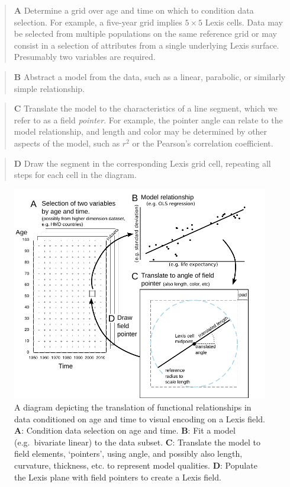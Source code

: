 \documentclass[10pt, twoside, parskip=half]{article}
\begin{document}
\begin{quote}
\textbf{A} Determine a grid over age and time on which to condition data selection. For example, a five-year grid implies \(5\times 5\) Lexis cells. Data may be selected from multiple populations on the same reference grid or may consist in a selection of attributes from a single underlying Lexis surface. Presumably two variables are required.
\end{quote}

\begin{quote}
\textbf{B} Abstract a model from the data, such as a linear, parabolic, or similarly simple relationship.
\end{quote}

\begin{quote}
\textbf{C} Translate the model to the characteristics of a line segment, which we refer to as a field \emph{pointer}. For example, the pointer angle can relate to the model relationship, and length and color may be determined by other aspects of the model, such as \(r^2\) or the Pearson's correlation coefficient.
\end{quote}

\begin{quote}
\textbf{D} Draw the segment in the corresponding Lexis grid cell, repeating all steps for each cell in the diagram.
\end{quote}



\begin{figure}[!t]
\includegraphics[width=1\linewidth]{Figures/Fig1} \caption{A diagram depicting the translation of functional relationships in data conditioned on age and time to visual encoding on a Lexis field. \textbf{A}: Condition data selection on age and time. \textbf{B}: Fit a model (e.g.~bivariate linear) to the data subset. \textbf{C}: Translate the model to field elements, `pointers', using angle, and possibly also length, curvature, thickness, etc. to represent model qualities. \textbf{D}: Populate the Lexis plane with field pointers to create a Lexis field.}\label{fig:one}
\end{figure}
\FloatBarrier
\end{document}
